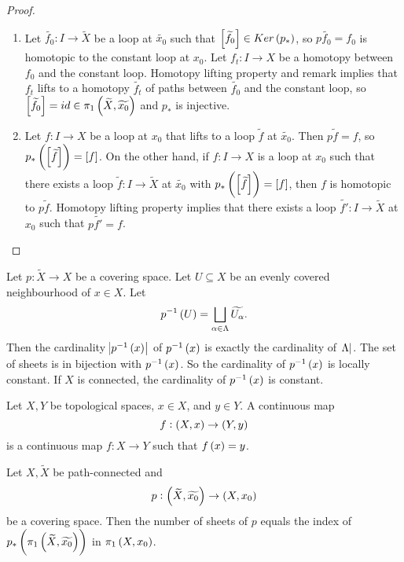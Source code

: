 \begin{proof}
\hfill
\begin{enumerate}
\item Let $ \widetilde{f_0} : I \to \widetilde{X} $ be a loop at $ \widetilde{x_0} $ such that $ \sbr{\widetilde{f_0}} \in Ker\br{p_*} $, so $ p\widetilde{f_0} = f_0 $ is homotopic to the constant loop at $ x_0 $. Let $ f_t : I \to X $ be a homotopy between $ f_0 $ and the constant loop. Homotopy lifting property and remark implies that $ f_t $ lifts to a homotopy $ \widetilde{f_t} $ of paths between $ \widetilde{f_0} $ and the constant loop, so $ \sbr{\widetilde{f_0}} = id \in \pi_1\br{\widetilde{X}, \widetilde{x_0}} $ and $ p_* $ is injective.
\item Let $ f : I \to X $ be a loop at $ x_0 $ that lifts to a loop $ \widetilde{f} $ at $ \widetilde{x_0} $. Then $ p\widetilde{f} = f $, so $ p_*\br{\sbr{\widetilde{f}}} = \sbr{f} $. On the other hand, if $ f : I \to X $ is a loop at $ x_0 $ such that there exists a loop $ \widetilde{f} : I \to \widetilde{X} $ at $ \widetilde{x_0} $ with $ p_*\br{\sbr{\widetilde{f}}} = \sbr{f} $, then $ f $ is homotopic to $ p\widetilde{f} $. Homotopy lifting property implies that there exists a loop $ \widetilde{f'} : I \to \widetilde{X} $ at $ x_0 $ such that $ p\widetilde{f'} = f $.
\end{enumerate}
\end{proof}

\pagebreak


Let $ p : \widetilde{X} \to X $ be a covering space. Let $ U \subseteq X $ be an evenly covered neighbourhood of $ x \in X $. Let
$$ p^{-1}\br{U} = \bigsqcup_{\alpha \in \Lambda} \widetilde{U_\alpha}. $$
Then the cardinality $ \abs{p^{-1}\br{x}} $ of $ p^{-1}\br{x} $ is exactly the cardinality of $ \abs{\Lambda} $. The set of sheets is in bijection with $ p^{-1}\br{x} $. So the cardinality of $ p^{-1}\br{x} $ is locally constant. If $ X $ is connected, the cardinality of $ p^{-1}\br{x} $ is constant.

\begin{notation*}
Let $ X, Y $ be topological spaces, $ x \in X $, and $ y \in Y $. A continuous map
$$ f : \br{X, x} \to \br{Y, y} $$
is a continuous map $ f : X \to Y $ such that $ f\br{x} = y $.
\end{notation*}

\begin{proposition}
Let $ X, \widetilde{X} $ be path-connected and
$$ p : \br{\widetilde{X}, \widetilde{x_0}} \to \br{X, x_0} $$
be a covering space. Then the number of sheets of $ p $ equals the index of $ p_*\br{\pi_1\br{\widetilde{X}, \widetilde{x_0}}} $ in $ \pi_1\br{X, x_0} $.
\end{proposition}

